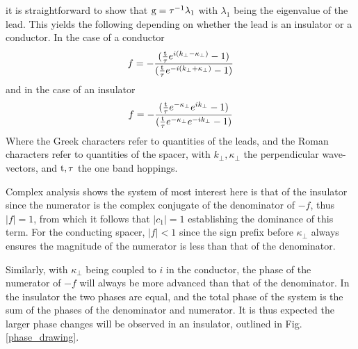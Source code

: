\documentclass[a4paper, 12pt]{article}
\begin{document}
it is straightforward to show that 
$\rm g =\tau^{-1}\lambda_1$ with $\lambda_1$ being the eigenvalue of the lead.
This yields the following depending on whether the lead is an insulator or a conductor. In the case of a conductor
\begin{equation}\label{conductor}
	f = -\frac{(\frac{\rm t}{\tau}e^{i(k_\perp - \kappa_\perp)}-1)}{(\frac{\rm t}{\tau}e^{-i(k_\perp +\kappa_\perp)}-1)}
\end{equation}
and in the case of an insulator
\begin{equation}\label{insulator}
	f = -\frac{(\frac{\rm t}{\tau}e^{-\kappa_\perp} e^{ ik_\perp}-1)}{(\frac{\rm t}{\tau}e^{-\kappa_\perp} e^{-ik_\perp}-1)}
\end{equation}
Where the Greek characters refer to quantities of the leads, and the Roman characters refer to quantities of the spacer, with $k_\perp, \kappa_\perp$ the perpendicular wave-vectors, and ${\rm t}, \tau$ the one band hoppings.
\par Complex analysis shows the system of most interest here is that of the insulator since the numerator is the complex conjugate of the denominator of $-f$, thus $|f|=1$, from which it follows that $|c_1| = 1$ establishing the dominance of this term. For the conducting spacer, $|f|<1$ since the sign prefix before $\kappa_\perp$ always ensures the magnitude of the numerator is less than that of the denominator.
\par Similarly, with $\kappa_\perp$ being coupled to $i$ in the conductor, the phase of the numerator of $-f$ will always be more advanced than that of the denominator. In the insulator the two phases are equal, and the total phase of the system is the sum of the phases of the denominator and numerator. It is thus expected the larger phase changes will be observed in an insulator, outlined in Fig. \ref{phase_drawing}.
\end{document}
